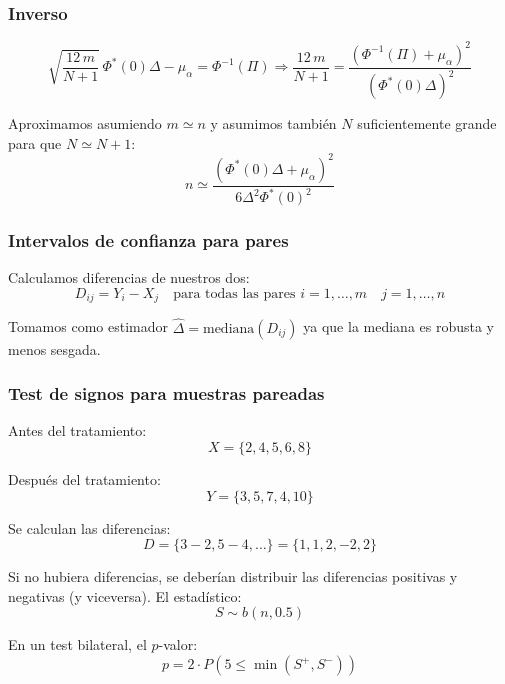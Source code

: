 \subsubsection{Inverso}
\[
\sqrt{\frac{12 \, m}{N+1}} \, \Phi^*(0) \Delta - \mu_\alpha = \Phi^{-1}(\Pi)
\Longrightarrow 
\frac{12 \, m}{N+1} = \frac{\left(\Phi^{-1}(\Pi) + \mu_\alpha\right)^2}{\left(\Phi^*(0) \Delta\right)^2}
\]

Aproximamos asumiendo $m \simeq  n$ y asumimos también $N$ suficientemente grande para que $N \simeq N+1$:
\[
n \simeq \frac{\left(\Phi^*(0) \Delta + \mu_\alpha\right)^2}{6 \Delta^2 \Phi^*(0)^2}
\]

\subsubsection{Intervalos de confianza para pares}

Calculamos diferencias de nuestros dos:
\[
D_{ij} = Y_i - X_j \quad \text{para todas las pares } i=1, \dots, m \quad j=1, \dots, n
\]

Tomamos como estimador 
\(
\hat{\Delta} = \text{mediana}(D_{ij})\) ya que la mediana es robusta y menos sesgada.


\subsubsection{Test de signos para muestras pareadas}

Antes del tratamiento:
\[
X = \{2, 4, 5, 6, 8\}
\]

Después del tratamiento:
\[
Y = \{3, 5, 7, 4, 10\}
\]

Se calculan las diferencias:
\[
D = \{3-2, 5-4, \dots\} = \{1, 1, 2, -2, 2\}
\]

Si no hubiera diferencias, se deberían distribuir las diferencias positivas y negativas (y viceversa). El estadístico:
\[
S \sim b(n, 0.5)
\]

En un test bilateral, el $p$-valor:
\[
p = 2 \cdot P(5 \leq \min(S^+, S^-))
\]

